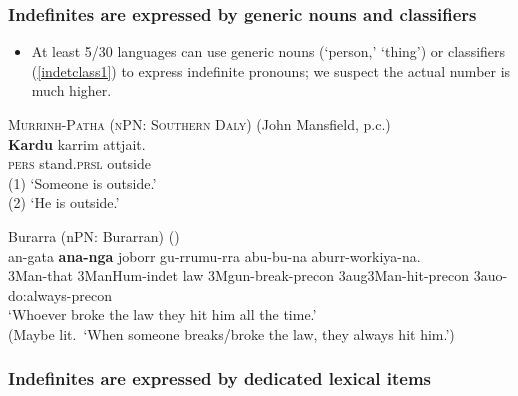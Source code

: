 \documentclass{article}
\begin{document}
\subsubsection{Indefinites are expressed by generic nouns and classifiers \label{sec:gnindf}}

\begin{itemize}
    \item At least 5/30 languages can use generic nouns (`person,' `thing') or classifiers (\ref{indetclass1}) to express indefinite pronouns; we suspect the actual number is much higher.
\end{itemize}

\begin{exe}
  \ex\label{ex:mpcli} \textsc{Murrinh-Patha (nPN: Southern Daly)} (John Mansfield, p.c.)\\
  \gll \textbf{Kardu} karrim attjait.\\
  \textsc{pers} stand.\textsc{prsl} outside\\
  \glt (1) `Someone is outside.'\\
  (2) `He is outside.'
  
  \ex \label{indetclass1} {\sc Burarra (nPN: Burarran)} (\citealt[9]{green87})\\
  \gll   an-gata    \textbf{ana-nga}            joborr    gu-rrumu-rra
  abu-bu-na            aburr-workiya-na. \\ 
  3Man-that     3ManHum-{\sc indet}    law     3Mgun-break-{\sc precon}  3{\sc aug}3Man-hit-{\sc precon}    3{\sc auo}-do:always-{\sc precon} \\
  \glt `Whoever broke the law they hit him all the  time.'\\
  (Maybe lit.\ `When someone breaks/broke the law, they always hit him.')

  
\end{exe}


\subsubsection{Indefinites are expressed by dedicated lexical items
\label{sec:dili}}
\end{document}
